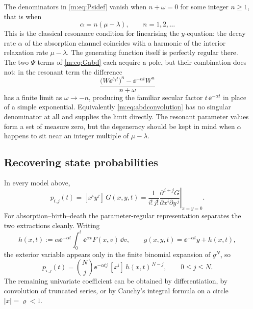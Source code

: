 \begin{remark}[Resonance]
\label{m:rem:resonance}
The denominators in \cref{m:eq:Psidef} vanish when $n+\omega=0$ for some integer
$n\ge1$, that is when
\begin{equation}
\label{m:eq:resonance}
\alpha = n(\mu-\lambda),\qquad n=1,2,\dots
\end{equation}
This is the classical resonance condition for linearising the $y$-equation: the
decay rate $\alpha$ of the absorption channel coincides with a harmonic of the
interior relaxation rate $\mu-\lambda$. The generating function itself is perfectly
regular there. The two $\Psi$ terms of \cref{m:eq:Gabd} each acquire a pole, but
their combination does not: in the resonant term the difference
\begin{equation*}
\frac{\bigl(W\ee^{b_1t}\bigr)^{n} - \ee^{-\alpha t}W^{n}}{n+\omega}
\end{equation*}
has a finite limit as $\omega\to-n$, producing the familiar secular factor
$t\,\ee^{-\alpha t}$ in place of a simple exponential. Equivalently
\cref{m:eq:abdconvolution} has no singular denominator at all and supplies the
limit directly. The resonant parameter values form a set of measure zero, but the
degeneracy should be kept in mind when $\alpha$ happens to sit near an integer
multiple of $\mu-\lambda$.
\end{remark}

\subsection{Recovering state probabilities}
\label{m:app:coefrecovery}

In every model above,
\begin{equation}
\label{m:eq:bivariatecoef}
p_{i,j}(t) = [x^iy^j]\,G(x,y,t)
= \frac{1}{i!\,j!}\left.\frac{\partial^{\,i+j}G}{\partial x^i\partial y^{\,j}}
\right|_{x=y=0} .
\end{equation}
For absorption--birth--death the parameter-regular representation separates the two
extractions cleanly. Writing
\begin{equation}
\label{m:eq:hdef}
h(x,t) := \alpha\ee^{-\alpha t}\int_0^t\ee^{\alpha v}F(x,v)\,\dd v,
\qquad
g(x,y,t) = \ee^{-\alpha t}y + h(x,t),
\end{equation}
the exterior variable appears only in the finite binomial expansion of $g^N$, so
\begin{equation}
\label{m:eq:abdcoef}
p_{i,j}(t) = \binom{N}{j}\ee^{-\alpha tj}\,[x^i]\,h(x,t)^{\,N-j},
\qquad 0\le j\le N .
\end{equation}
The remaining univariate coefficient can be obtained by differentiation, by
convolution of truncated series, or by Cauchy's integral formula on a circle
$|x|=\varrho<1$.

\FloatBarrier
